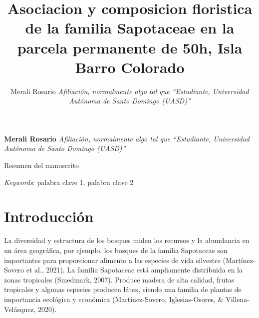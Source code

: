 \documentclass[11pt,]{article}
\title{Asociacion y composicion floristica de la familia Sapotaceae en la
parcela permanente de 50h, Isla Barro Colorado  }
\author{\Large Merali Rosario\vspace{0.05in} \newline\normalsize\emph{Afiliación, normalmente algo tal que ``Estudiante, Universidad Autónoma
de Santo Domingo (UASD)''}  }
\date{}
\newcommand*{\authorfont}{\fontfamily{phv}\selectfont}
\renewenvironment{abstract}
 {{%
    \setlength{\leftmargin}{0mm}
    \setlength{\rightmargin}{\leftmargin}%
  }%
  \relax}
 {\endlist}
\begin{document}
	
%

{%
\setlength{\parindent}{0pt}
\thispagestyle{plain}
{\fontsize{18}{20}\selectfont\raggedright 
\maketitle  %

}

{
   \vskip 13.5pt\relax \normalsize\fontsize{11}{12} 
\textbf{\authorfont Merali Rosario} \hskip 15pt \emph{\small Afiliación, normalmente algo tal que ``Estudiante, Universidad Autónoma
de Santo Domingo (UASD)''}   

}

}








\begin{abstract}

    \hbox{\vrule height .2pt width 39.14pc}

    \vskip 8.5pt %

\noindent Resumen del manuscrito


\vskip 8.5pt \noindent \emph{Keywords}: palabra clave 1, palabra clave 2 \par

    \hbox{\vrule height .2pt width 39.14pc}



\end{abstract}


\vskip 6.5pt


\noindent  \section{Introducción}\label{introducciuxf3n}

La diversidad y estructura de los bosques miden los recursos y la
abundancia en un área geográfica, por ejemplo, los bosques de la familia
Sapotaceae son importantes para proporcionar alimento a las especies de
vida silvestre (Martínez-Sovero et al., 2021). La familia Sapotaceae
está ampliamente distribuida en la zonas tropicales (Smedmark, 2007).
Produce madera de alta calidad, frutas tropicales y algunas especies
producen látex, siendo una familia de plantas de importancia ecológica y
económica (Martínez-Sovero, Iglesias-Osores, \& Villena-Velásquez,
2020).
\end{document}
